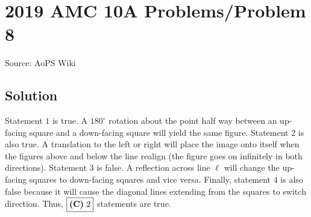 \documentclass[12pt]{article}
\begin{document}
\section*{{2019 AMC 10A Problems/Problem 8}}
Source: AoPS Wiki

\subsection*{Solution}
Statement $1$ is true. A $180^{\circ}$ rotation about the point half way between an up-facing square and a down-facing square will yield the same figure. Statement $2$ is also true. A translation to the left or right will place the image onto itself when the figures above and below the line realign (the figure goes on infinitely in both directions). Statement $3$ is false. A reflection across line $\ell$ will change the up-facing squares to down-facing squares and vice versa. Finally, statement $4$ is also false because it will cause the diagonal lines extending from the squares to switch direction. Thus, $\fbox {\textbf{(C)} 2}$ statements are true.
\end{document}
